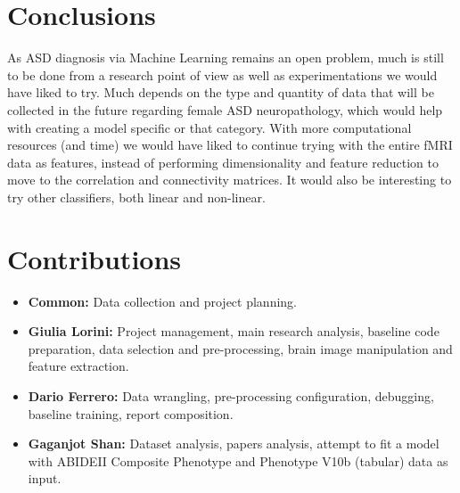 \documentclass{article}
\begin{document}
\section{Conclusions}

As ASD diagnosis via Machine Learning remains an open problem, much is still to be done from a research point of view as well as experimentations we would have liked to try. Much depends on the type and quantity of data that will be collected in the future regarding female ASD neuropathology, which would help with creating a model specific or that category. With more computational resources (and time) we would have liked to continue trying with the entire fMRI data as features, instead of performing dimensionality and feature reduction to move to the correlation and connectivity matrices.
It would also be interesting to try other classifiers, both linear and non-linear.

\section{Contributions}
\begin{itemize}
	\item \textbf{Common:} Data collection and project planning.
	\item \textbf{Giulia Lorini:} Project management, main research analysis, baseline code preparation, data selection and pre-processing, brain image manipulation and feature extraction.
	\item \textbf{Dario Ferrero:} Data wrangling, pre-processing configuration, debugging, baseline training, report composition.
	\item \textbf{Gaganjot Shan:} Dataset analysis, papers analysis, attempt to fit a model with ABIDEII Composite Phenotype and Phenotype V10b (tabular) data as input.
\end{itemize}

\clearpage

\end{document}
